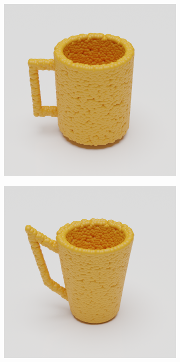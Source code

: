\documentclass{article}
\begin{document}
\begin{figure}
\begin{subfigure}[b]{0.19\textwidth}
    \end{subfigure}
    \begin{subfigure}[b]{0.19\textwidth}
        \includegraphics[width=\textwidth]{figures/blender/warp3/23.png}
    \end{subfigure}
    \begin{subfigure}[b]{0.19\textwidth}
        \includegraphics[width=\textwidth]{figures/blender/warp3/24.png}

\end{subfigure}
\end{figure}
\end{document}
